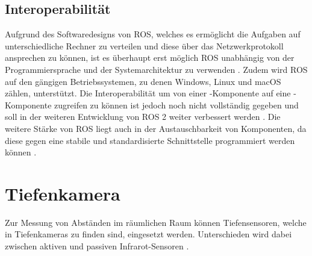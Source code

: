 \subsection{Interoperabilität}
Aufgrund des Softwaredesigns von ROS, welches es ermöglicht die Aufgaben auf unterschiedliche Rechner zu verteilen und diese über das Netzwerkprotokoll ansprechen zu können, ist es überhaupt erst möglich ROS unabhängig von der Programmiersprache und der Systemarchitektur zu verwenden \cite{rosorg_is_ros_for_me_nodate}. Zudem wird ROS auf den gängigen Betriebssystemen, zu denen Windows, Linux und macOS zählen, unterstützt. Die Interoperabilität um von einer -Komponente auf eine -Komponente zugreifen zu können ist jedoch noch nicht vollständig gegeben und soll in der weiteren Entwicklung von ROS 2 weiter verbessert werden \cite{ros_2_features_nodate}. Die weitere Stärke von ROS liegt auch in der Austauschbarkeit von Komponenten, da diese gegen eine stabile und standardisierte Schnittstelle programmiert werden können \cite{roboter_schnittstellen_nodate}.

\section{Tiefenkamera}
Zur Messung von Abständen im räumlichen Raum können Tiefensensoren, welche in Tiefenkameras zu finden sind, eingesetzt werden. Unterschieden wird dabei zwischen aktiven und passiven Infrarot-Sensoren \cite{understanding_infrared_sensors_nodate}.

